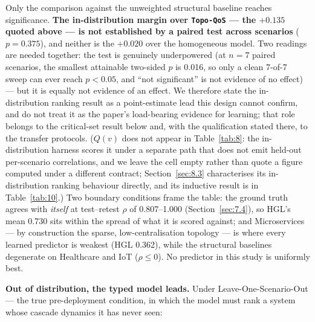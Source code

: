Only the comparison against the unweighted structural baseline reaches significance. \textbf{The
in-distribution margin over \texttt{Topo-QoS} --- the \(+0.135\) quoted above --- is not established
by a paired test across scenarios} (\(p = 0.375\)), and neither is the \(+0.020\) over the
homogeneous model. Two readings are needed together: the test is genuinely underpowered (at \(n=7\)
paired scenarios, the smallest attainable two-sided \(p\) is 0.016, so only a clean 7-of-7 sweep can
ever reach \(p < 0.05\), and ``not significant'' is not evidence of no effect) --- but it is equally
not evidence of an effect. We therefore state the in-distribution ranking result as a point-estimate
lead this design cannot confirm, and do not treat it as the paper's load-bearing evidence for
learning; that role belongs to the critical-set result below and, with the qualification stated
there, to the transfer protocols. (\(Q(v)\) does not appear in Table~\ref{tab:8}: the in-distribution
harness scores it under a separate path that does not emit held-out per-scenario correlations, and we
leave the cell empty rather than quote a figure computed under a different contract;
Section~\ref{sec:8.3} characterises its in-distribution ranking behaviour directly, and its inductive
result is in Table~\ref{tab:10}.) Two boundary conditions frame the table: the ground truth agrees
with \emph{itself} at test--retest \(\rho\) of 0.807--1.000 (Section~\ref{sec:7.4}), so HGL's mean
0.730 sits within the spread of what it is scored against; and Microservices --- by construction the
sparse, low-centralisation topology --- is where every learned predictor is weakest (HGL 0.362),
while the structural baselines degenerate on Healthcare and IoT (\(\rho \le 0\)). No predictor in
this study is uniformly best.

\textbf{Out of distribution, the typed model leads.} Under Leave-One-Scenario-Out --- the true
pre-deployment condition, in which the model must rank a system whose cascade dynamics it has never
seen:

